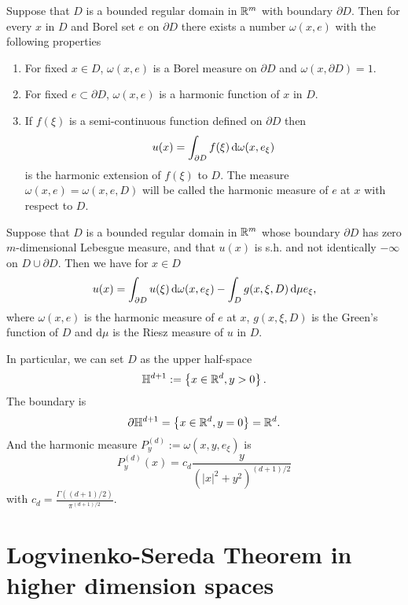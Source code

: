 \begin{theorem}
	Suppose that $D$ is a bounded regular domain in $\mathbb{R}^{m}$ with boundary $\partial D$. Then for every $x$ in $D$ and Borel set $e$ on $\partial D$ there exists a number $\omega(x,e)$ with the following properties
	\begin{enumerate}
		\item For fixed $x\in D$, $\omega(x,e)$ is a Borel measure on $\partial D$ and $\omega(x,\partial D)=1$.
		\item For fixed $e\subset \partial D$, $\omega(x,e)$ is a harmonic function of $x$ in $D$.
		\item If $f(\xi)$ is a semi-continuous function defined on $\partial D$ then 
			\begin{equation}
				 u(x)=\int_{\partial D}f(\xi)\,\mathrm{d} \omega(x,e_\xi)
			\end{equation}is the harmonic extension of $f(\xi)$ to $D$. The measure $\omega(x,e)=\omega(x,e,D)$ will be called the harmonic measure of $e$ at $x$ with respect to $D$.
	\end{enumerate}
\end{theorem}

\begin{theorem}\label{thm:poisson-jensen}
	Suppose that $D$ is a bounded regular domain in $\mathbb{R}^{m}$ whose boundary  $\partial D$ has zero $m$-dimensional Lebesgue measure, and that $u(x)$ is s.h. and not identically $-\infty$ on $D \cup \partial D$. Then we have for $x\in D$ 
	\begin{equation}
		u(x)=\int_{\partial D}u(\xi)\,\mathrm{d} \omega(x,e_{\xi})-\int_D g(x,\xi,D)\,\mathrm{d} \mu e_{\xi},
	\end{equation}
	where $\omega(x,e)$ is the harmonic measure of $e$ at $x$, $g(x,\xi,D)$ is the Green's function of $D$ and $\mathrm{d} \mu$ is the Riesz measure of $u$ in $D$.
\end{theorem}
In particular, we can set $D$ as the upper half-space 
\[
\mathbb{H}^{d+1}:=\left\{x\in \mathbb{R}^{d},y>0\right\}. 
\] The boundary is 
\[
\partial \mathbb{H}^{d+1}=\left\{x\in \mathbb{R}^{d},y=0\right\} =\mathbb{R}^{d}.
\]
And the harmonic measure $P^{(d)}_y:=\omega(x,y,e_{\xi})$ is
\begin{equation}
	P^{(d)}_y(x)=c_{d} \frac{y}{\left( |x|^2+y^2 \right) ^{(d+1) /2}}
\end{equation}
with $c_{d}= \frac{\Gamma\left( (d+1) /2 \right) }{\pi ^{(d+1) /2}}$.

\section{Logvinenko-Sereda Theorem in higher dimension spaces}

